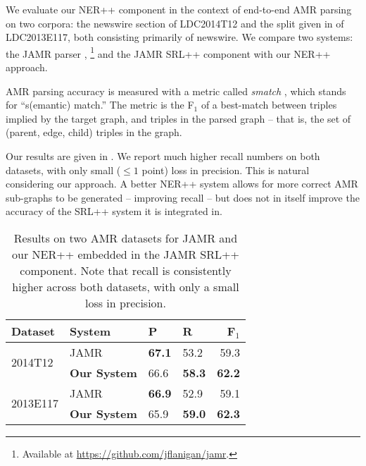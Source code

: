 \documentclass[11pt]{article}
\newcommand\w[1]{\textit{#1}} %
\begin{document}
We evaluate our NER++ component in the context of end-to-end AMR parsing
on two corpora: the newswire section of LDC2014T12 and the split given in \cite{2014flanigan-amr} of LDC2013E117, both consisting primarily of newswire.
We compare two systems: the JAMR parser \cite{2014flanigan-amr},
  \footnote{Available at \url{https://github.com/jflanigan/jamr}.}
  and the JAMR SRL++ component with our NER++ approach.

AMR parsing accuracy is measured with a metric called \w{smatch} \cite{cai2013smatch-amr}, which stands 
  for ``s(emantic) match.'' 
The metric is the F$_1$ of a best-match between triples implied by the target graph, 
  and triples in the parsed graph -- that is, the set of (parent, edge, child) triples
  in the graph.


Our results are given in .
We report much higher recall numbers on both datasets, with only small ($\leq 1$ point) 
  loss in precision.
This is natural considering our approach.
A better NER++ system allows for more correct AMR sub-graphs to be generated --
  improving recall -- but does not in itself improve the accuracy of the
  SRL++ system it is integrated in.


\begin{table}[t]
\begin{center}
\begin{tabular}{l|l|llr}
\textbf{Dataset} &  \textbf{System} & \textbf{P} & \textbf{R} & \textbf{F$_1$} \\
\hline
\multirow{2}{*}{2014T12} & JAMR & \textbf{67.1} & 53.2 & 59.3 \\
  & \textbf{Our System} & 66.6 & \textbf{58.3} & \textbf{62.2} \\
\hline
\multirow{2}{*}{2013E117} & JAMR & \textbf{66.9} & 52.9 & 59.1 \\
  & \textbf{Our System} & 65.9 & \textbf{59.0} & \textbf{62.3} \\
\end{tabular}
\end{center}
\caption{\label{tab:results} 
Results on two AMR datasets for JAMR and our NER++ embedded in the JAMR SRL++
  component.
Note that recall is consistently higher across both datasets, with only a small
  loss in precision.
}
\end{table}
\end{document}
